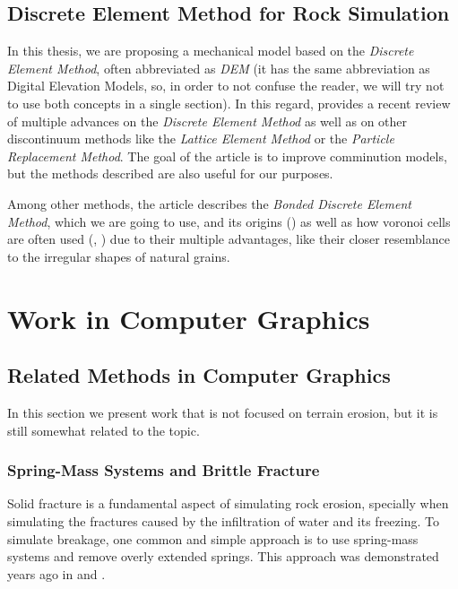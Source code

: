 \subsection{Discrete Element Method for Rock Simulation}

In this thesis, we are proposing a mechanical model based on the 
\textit{Discrete Element Method}, often abbreviated as \textit{DEM} (it 
has the same abbreviation as Digital Elevation Models, so, in order 
to not confuse the reader, we will try not to use both concepts in a single 
section). In this regard, \cite{tojaga2025advances} provides a 
recent review of multiple advances on the \textit{Discrete Element Method} as well as 
on other discontinuum methods like the \textit{Lattice Element Method}
or the \textit{Particle Replacement Method}. The goal of the article 
is to improve comminution models, but the methods described are also 
useful for our purposes.

\vspace{10pt}

Among other methods, the article describes the \textit{Bonded Discrete Element Method}, which 
we are going to use, and its origins (\cite{POTYONDY20041329}) as well 
as how voronoi cells are often used (\cite{orozco2019discrete}, \cite{cantor2017three}) due to their multiple advantages,
like their closer resemblance to the irregular shapes of natural grains. 


\section{Work in Computer Graphics}
\subsection{Related Methods in Computer Graphics}

In this section we present work that is not focused on terrain erosion, 
but it is still somewhat related to the topic.

\subsubsection{Spring-Mass Systems and Brittle Fracture}
Solid fracture is a fundamental aspect of simulating rock erosion, specially
when simulating the fractures caused by the infiltration of water and its 
freezing. To simulate breakage, one common and simple approach is to use
spring-mass systems and remove overly extended springs. This approach was 
demonstrated years ago in \cite{10.1007/BF01900837} and \cite{10.1145/54852.378522}.

